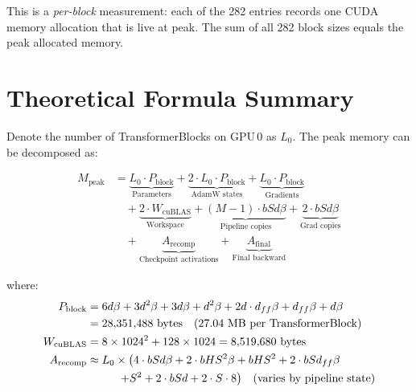 \documentclass[11pt,a4paper]{article}
\begin{document}
This is a \emph{per-block} measurement: each of the 282 entries records one CUDA memory allocation that is live at peak.  The sum of all 282 block sizes equals the peak allocated memory.

\section{Theoretical Formula Summary}
\label{sec:formula}

Denote the number of TransformerBlocks on GPU\,0 as $L_0$.  The peak memory can be decomposed as:

\begin{equation}
\boxed{
\begin{aligned}
  M_{\text{peak}} &= \underbrace{L_0 \cdot P_{\text{block}}}_{\text{Parameters}}
                   + \underbrace{2 \cdot L_0 \cdot P_{\text{block}}}_{\text{AdamW states}}
                   + \underbrace{L_0 \cdot P_{\text{block}}}_{\text{Gradients}} \\
                  &\quad + \underbrace{2 \cdot W_{\text{cuBLAS}}}_{\text{Workspace}}
                   + \underbrace{(M-1) \cdot bSd\beta}_{\text{Pipeline copies}}
                   + \underbrace{2 \cdot bSd\beta}_{\text{Grad copies}} \\
                  &\quad + \underbrace{A_{\text{recomp}}}_{\text{Checkpoint activations}}
                   + \underbrace{A_{\text{final}}}_{\text{Final backward}}
\end{aligned}
}
\label{eq:peak}
\end{equation}

where:
\begin{align}
  P_{\text{block}} &= 6d\beta + 3d^2\beta + 3d\beta + d^2\beta + 2d \cdot d_{ff}\beta + d_{ff}\beta + d\beta \notag \\
                   &= 28{,}351{,}488 \text{~bytes} \quad (27.04~\text{MB per TransformerBlock}) \\
  W_{\text{cuBLAS}} &= 8 \times 1024^2 + 128 \times 1024 = 8{,}519{,}680 \text{~bytes} \\
  A_{\text{recomp}} &\approx L_0 \times \bigl(4 \cdot bSd\beta + 2 \cdot bHS^2\beta + bHS^2 + 2 \cdot bSd_{ff}\beta\bigr. \notag \\
                    &\qquad\quad \bigl.+ S^2 + 2 \cdot bSd + 2 \cdot S \cdot 8 \bigr) \quad \text{(varies by pipeline state)}
\end{align}
\end{document}
